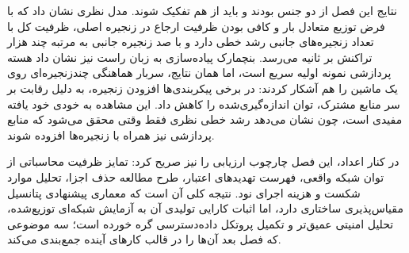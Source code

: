 نتایج این فصل از دو جنس بودند و باید از هم تفکیک شوند. مدل نظری نشان داد که با فرض توزیع متعادل بار و کافی بودن ظرفیت ارجاع در زنجیره اصلی، ظرفیت کل با تعداد زنجیره‌های جانبی رشد خطی دارد و با صد زنجیره جانبی به مرتبه چند هزار تراکنش بر ثانیه می‌رسد. بنچمارک پیاده‌سازی به زبان راست نیز نشان داد هسته پردازشی نمونه اولیه سریع است، اما همان نتایج، سربار هماهنگی چندزنجیره‌ای روی یک ماشین را هم آشکار کردند: در برخی پیکربندی‌ها افزودن زنجیره، به دلیل رقابت بر سر منابع مشترک، توان اندازه‌گیری‌شده را کاهش داد. این مشاهده به خودی خود یافته مفیدی است، چون نشان می‌دهد رشد خطی نظری فقط وقتی محقق می‌شود که منابع پردازشی نیز همراه با زنجیره‌ها افزوده شوند.

در کنار اعداد، این فصل چارچوب ارزیابی را نیز صریح کرد: تمایز ظرفیت محاسباتی از توان شبکه واقعی، فهرست تهدیدهای اعتبار، طرح مطالعه حذف اجزا، تحلیل موارد شکست و هزینه اجرای نود. نتیجه کلی آن است که معماری پیشنهادی پتانسیل مقیاس‌پذیری ساختاری دارد، اما اثبات کارایی تولیدی آن به آزمایش شبکه‌ای توزیع‌شده، تحلیل امنیتی عمیق‌تر و تکمیل پروتکل داده‌دسترسی گره خورده است؛ سه موضوعی که فصل بعد آن‌ها را در قالب کارهای آینده جمع‌بندی می‌کند.
